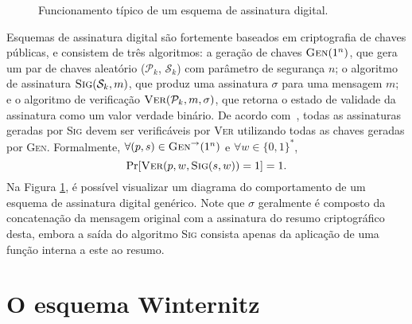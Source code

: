 \documentclass{article}
\newcommand{\pk}{$\mathcal{P}_k$}
\newcommand{\sk}{$\mathcal{S}_k$}
\newcommand{\hash}[2][]{\mathcal{H}^{#1}(#2)}
\newcommand{\concat}{\, \vert \vert \,}
\newcommand{\binwds}[1]{\{0, 1\}^{#1}}
\begin{document}
\begin{figure}[h]
  \centering
  \caption{Funcionamento típico de um esquema de assinatura digital.}
  \label{fig:2}
\end{figure}

Esquemas de assinatura digital são fortemente baseados em criptografia de
chaves públicas, e consistem de três algoritmos: a geração de chaves
$\textsc{Gen}(1^n)$, que gera um par de chaves aleatório (\pk{},
 \sk{}) com parâmetro de segurança $n$; o algoritmo de assinatura
$\textsc{Sig}(\text{\sk{}}, m)$, que produz uma assinatura $\sigma$ para uma
mensagem $m$; e o algoritmo de verificação $\textsc{Ver}(\text{\pk{}}, m,
\sigma)$, que retorna o estado de validade da assinatura como um valor verdade
binário. De acordo com~\cite{Goldreich:2004:FCV:975541}, todas as assinaturas
geradas por \textsc{Sig} devem ser verificáveis por \textsc{Ver} utilizando
todas as chaves geradas por \textsc{Gen}. Formalmente, $\forall (p, s) \in
\textsc{Gen}^{\rightarrow}(1^n)$ e $\forall w \in \binwds{*}$,
\begin{equation}
    \text{Pr}[\textsc{Ver}(p, w, \textsc{Sig}(s, w)) = 1] = 1.
\end{equation}
Na Figura \ref{fig:2}, é possível visualizar um diagrama do comportamento de
um esquema de assinatura digital genérico. Note que $\sigma$ geralmente é
composto da concatenação da mensagem original com a assinatura do resumo
criptográfico desta, embora a saída do algoritmo \textsc{Sig} consista apenas
da aplicação de uma função interna a este ao resumo.

\section{O esquema Winternitz}
\end{document}
